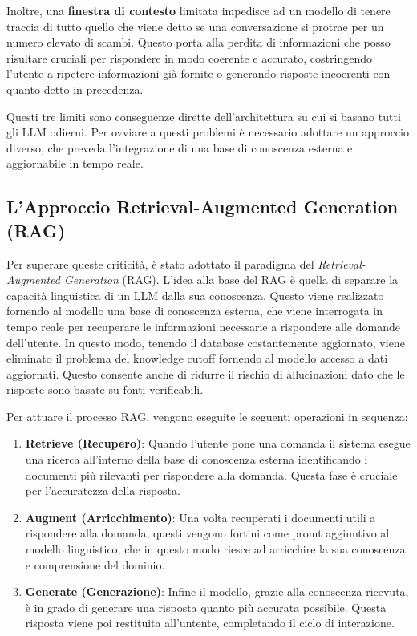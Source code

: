Inoltre, una \textbf{finestra di contesto} limitata impedisce ad un modello di tenere traccia di tutto quello che viene detto se una conversazione si protrae per un numero elevato di scambi. Questo porta alla perdita di informazioni che posso risultare cruciali per rispondere in modo coerente e accurato, costringendo l'utente a ripetere informazioni già fornite o generando risposte incoerenti con quanto detto in precedenza.

Questi tre limiti sono conseguenze dirette dell'architettura su cui si basano tutti gli LLM odierni. Per ovviare a questi problemi è necessario adottare un approccio diverso, che preveda l'integrazione di una base di conoscenza esterna e aggiornabile in tempo reale.

\subsection{L'Approccio Retrieval-Augmented Generation (RAG)}

Per superare queste criticità, è stato adottato il paradigma del \textit{Retrieval-Augmented Generation} (RAG). L'idea alla base del RAG è quella di separare la capacità linguistica di un LLM dalla sua conoscenza. Questo viene realizzato fornendo al modello una base di conoscenza esterna, che viene interrogata in tempo reale per recuperare le informazioni necessarie a rispondere alle domande dell'utente. In questo modo, tenendo il database costantemente aggiornato, viene eliminato il problema del knowledge cutoff fornendo al modello accesso a dati aggiornati. Questo consente anche di ridurre il rischio di allucinazioni dato che le risposte sono basate su fonti verificabili.

Per attuare il processo RAG, vengono eseguite le seguenti operazioni in sequenza:
\begin{enumerate}
    \item \textbf{Retrieve (Recupero)}: Quando l'utente pone una domanda il sistema esegue una ricerca all'interno della base di conoscenza esterna identificando i documenti più rilevanti per rispondere alla domanda. Questa fase è cruciale per l'accuratezza della risposta.
    \item \textbf{Augment (Arricchimento)}: Una volta recuperati i documenti utili a rispondere alla domanda, questi vengono fortini come promt aggiuntivo al modello linguistico, che in questo modo riesce ad arricchire la sua conoscenza e comprensione del dominio.
    \item \textbf{Generate (Generazione)}: Infine il modello, grazie alla conoscenza ricevuta, è in grado di generare una risposta quanto più accurata possibile. Questa risposta viene poi restituita all'untente, completando il ciclo di interazione.
\end{enumerate}

